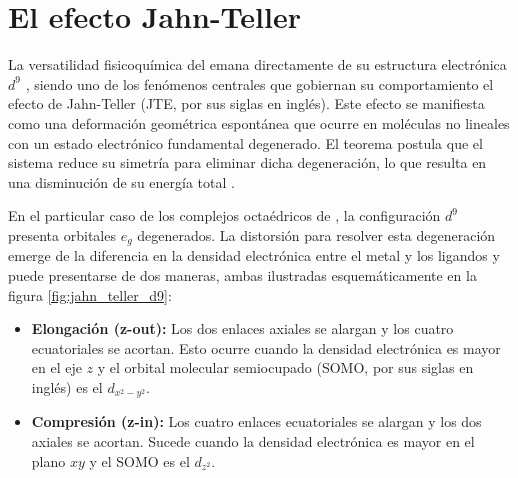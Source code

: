 \section{El efecto Jahn-Teller}

    La versatilidad fisicoquímica del  emana directamente de su estructura electrónica \ce{[Ar]}$d^9$ , siendo uno de los fenómenos centrales que gobiernan su comportamiento el efecto de Jahn-Teller (JTE, por sus siglas en inglés). Este efecto se manifiesta como una deformación geométrica espontánea que ocurre en moléculas no lineales con un estado electrónico fundamental degenerado. El teorema postula que el sistema reduce su simetría para eliminar dicha degeneración, lo que resulta en una disminución de su energía total \cite{Cu-2019-01}.

    En el particular caso de los complejos octaédricos de , la configuración \ce{[Ar]}$d^9$ presenta orbitales $e_g$ degenerados. La distorsión para resolver esta degeneración emerge de la diferencia en la densidad electrónica entre el metal y los ligandos  y puede presentarse de dos maneras, ambas ilustradas esquemáticamente en la figura \ref{fig:jahn_teller_d9}:

    \begin{itemize}
        \item \textbf{Elongación (z-out):} Los dos enlaces axiales se alargan y los cuatro ecuatoriales se acortan. Esto ocurre cuando la densidad electrónica es mayor en el eje $z$ y el orbital molecular semiocupado (SOMO, por sus siglas en inglés) es el $d_{x^2-y^2}$.
        \item \textbf{Compresión (z-in):} Los cuatro enlaces ecuatoriales se alargan y los dos axiales se acortan. Sucede cuando la densidad electrónica es mayor en el plano $xy$ y el SOMO es el $d_{z^2}$.
    \end{itemize}



